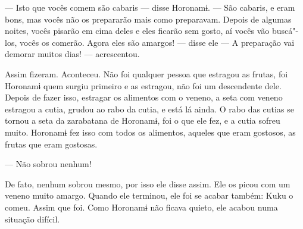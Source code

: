 --- Isto que vocês comem são cabaris --- disse Horonamɨ. --- São
cabaris, e eram bons, mas vocês não os prepararão mais como preparavam.
Depois de algumas noites, vocês pisarão em cima deles e eles ficarão sem
gosto, aí vocês vão buscá"-los, vocês os comerão. Agora eles são
amargos! --- disse ele --- A preparação vai demorar muitos
dias! --- acrescentou. 

Assim fizeram. Aconteceu. Não foi qualquer pessoa que estragou as
frutas, foi Horonamɨ quem surgiu primeiro e as estragou, não foi um
descendente dele. Depois de fazer isso, estragar os alimentos com o
veneno, a seta com veneno estragou a cutia, grudou ao rabo da cutia, e
está lá ainda. O rabo das cutias se tornou a seta da zarabatana de
Horonamɨ, foi o que ele fez, e a cutia sofreu muito. Horonamɨ fez isso
com todos os alimentos, aqueles que eram gostosos, as frutas que eram
gostosas. 

--- Não sobrou nenhum!

De fato, nenhum sobrou mesmo, por isso ele disse assim. Ele os picou com
um veneno muito amargo. Quando ele terminou, ele foi se acabar também:
Kuku o comeu. Assim que foi. Como Horonamɨ não ficava quieto, ele acabou
numa situação difícil. 
